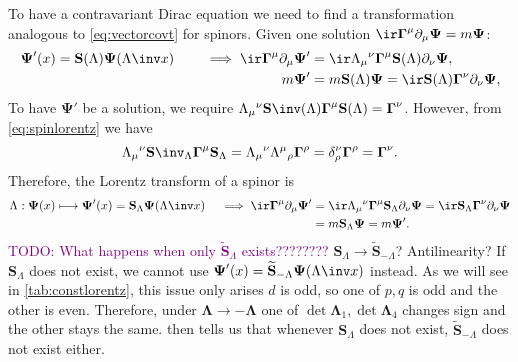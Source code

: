 \documentclass[11pt]{article}
\newcommand{\todo}[1]{\textcolor{purple}{TODO: #1}}
\newcommand{\Gammab}{\boldsymbol{\Gamma}}
\renewcommand{\S}{\mathbf{S}}
\newcommand{\St}{\widetilde{\S}}
\newcommand{\Psib}{\boldsymbol{\Psi}}
\newcommand{\Lambdab}{\boldsymbol{\Lambda}}
\begin{document}
To have a contravariant Dirac equation we need to find a transformation analogous to \cref{eq:vectorcovt} for spinors.
Given one solution \(\ir \Gammab^\mu \partial_\mu \Psib = m \Psib\):
%
\begin{equation*}
\begin{aligned}
  \Psib'(x) = \S(\Lambda) \Psib(\Lambda\inv x)
  \qquad\implies
  \ir \Gammab^\mu \partial_\mu \Psib'
    &= \ir \Lambda_\mu{}^\nu \Gammab^\mu \S(\Lambda) \partial_\nu \Psib, \\
  m \Psib' &= m \S(\Lambda) \Psib
    = \ir \S(\Lambda) \Gammab^\nu \partial_\nu \Psib,
\end{aligned}
\end{equation*}
%
To have \(\Psib'\) be a solution, we require \(\Lambda_\mu{}^\nu \S\inv(\Lambda) \Gammab^\mu \S(\Lambda) = \Gammab^\nu\).
However, from \cref{eq:spinlorentz} we have
%
\begin{equation*}
  \Lambda_\mu{}^\nu \S\inv_\Lambda \Gammab^\mu \S_\Lambda 
    = \Lambda_\mu{}^\nu \Lambda^\mu{}_\rho \Gammab^\rho
    = \delta^\nu_\rho \Gammab^\rho 
    = \Gammab^\nu.
\end{equation*}
%
Therefore, the Lorentz transform of a spinor is
%
\begin{equation}\label{eq:diraccovt}
\begin{aligned}
  \Lambda: \Psib(x) \longmapsto \Psib'(x) = \S_\Lambda \Psib(\Lambda\inv x)
  \quad \implies
  \ir \Gammab^\mu \partial_\mu \Psib'
    &= \ir \Lambda_\mu{}^\nu \Gammab^\mu \S_\Lambda \partial_\nu \Psib
    = \ir \S_\Lambda \Gammab^\nu \partial_\nu \Psib \\
    &= m \S_\Lambda \Psib
    = m \Psib'.
\end{aligned}
\end{equation}
%
\todo{What happens when only \(\St_\Lambda\) exists????????} 
\(\S_\Lambda \to \St_{-\Lambda}\)? Antilinearity?
If \(\S_\Lambda\) does not exist, we cannot use \( \Psib'(x) = \St_{-\Lambda} \Psib(\Lambda\inv x) \) instead.
As we will see in \cref{tab:constlorentz}, this issue only arises \(d\) is odd, so one of \(p,q\) is odd and the other is even.
Therefore, under \( \Lambdab \to -\Lambdab \) one of \(\det\Lambdab_1,\det\Lambdab_4\) changes sign and the other stays the same.
 then tells us that whenever \(\S_\Lambda\) does not exist, \(\St_{-\Lambda}\) does not exist either.
\end{document}
